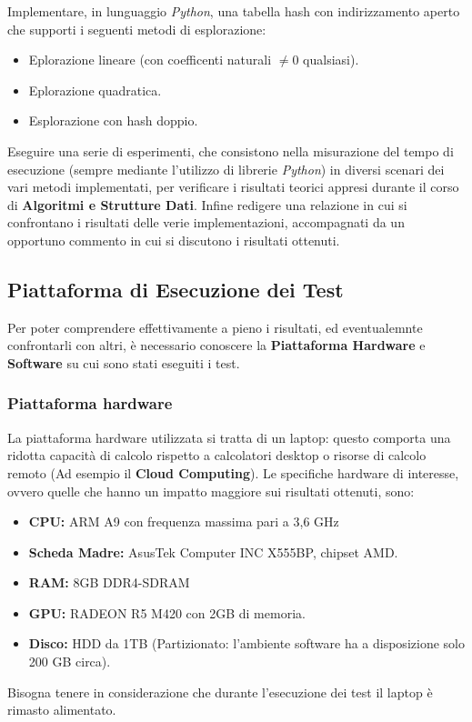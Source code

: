 \documentclass{article}
\begin{document}
Implementare, in lunguaggio \emph{Python}, una tabella hash con indirizzamento aperto che supporti i seguenti metodi di esplorazione:
\begin{itemize}
\item Eplorazione lineare (con coefficenti naturali $\neq 0$ qualsiasi).
\item Eplorazione quadratica.
\item Esplorazione con hash doppio.
\end{itemize}
Eseguire una serie di esperimenti, che consistono nella misurazione del tempo di esecuzione (sempre mediante l'utilizzo di librerie \emph{Python}) in diversi scenari dei vari metodi implementati, per verificare i risultati teorici appresi durante il corso di \textbf{Algoritmi e Strutture Dati}.
Infine redigere una relazione in cui si confrontano i risultati delle verie implementazioni, accompagnati da un opportuno commento in cui si discutono i risultati ottenuti.

\subsection{Piattaforma di Esecuzione dei Test}

Per poter comprendere effettivamente a pieno i risultati, ed eventualemnte confrontarli con altri, è necessario conoscere la \textbf{Piattaforma Hardware} e \textbf{Software} su cui sono stati eseguiti i test.
\subsubsection{Piattaforma hardware}

La piattaforma hardware utilizzata si tratta di un laptop: questo comporta una ridotta capacità di calcolo rispetto a calcolatori desktop o risorse di calcolo remoto (Ad esempio il \textbf{Cloud Computing}).
Le specifiche hardware di interesse, ovvero quelle che hanno un impatto maggiore sui risultati ottenuti, sono:
\begin{itemize}
\item \textbf{CPU:} ARM A9 con frequenza massima pari a 3,6 GHz
\item \textbf{Scheda Madre:} AsusTek Computer INC X555BP, chipset AMD.
\item \textbf{RAM:} 8GB DDR4-SDRAM
\item \textbf{GPU:} RADEON R5 M420 con 2GB di memoria.
\item \textbf{Disco:} HDD da 1TB (Partizionato: l'ambiente software ha a disposizione solo 200 GB circa).
\end{itemize} 
Bisogna tenere in considerazione che durante l'esecuzione dei test il laptop è rimasto alimentato.
\end{document}
